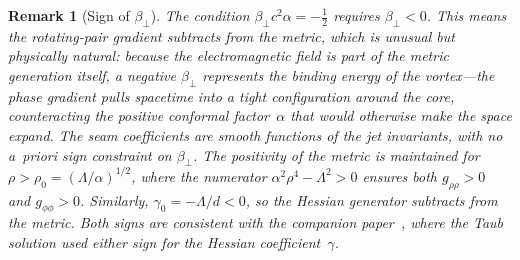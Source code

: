 \documentclass[pdflatex,sn-mathphys-num]{sn-jnl}
\theoremstyle{thmstyleone}%
\theoremstyle{thmstyletwo}%
\newtheorem{remark}[theorem]{Remark}
\theoremstyle{thmstylethree}%
\numberwithin{equation}{section}
\begin{document}
\begin{remark}[Sign of $\beta_\perp$]
\label{rem:beta-perp-sign}
The condition $\beta_\perp c^2 \alpha = -\tfrac{1}{2}$
requires $\beta_\perp < 0$.  This means the rotating-pair
gradient \emph{subtracts} from the metric, which is unusual
but physically natural: because the electromagnetic field is
part of the metric generation itself, a negative $\beta_\perp$
represents the \emph{binding energy} of the vortex---the
phase gradient pulls spacetime into a tight configuration
around the core, counteracting the positive conformal
factor~$\alpha$ that would otherwise make the space expand.
The seam coefficients are smooth functions of the jet
invariants, with no \emph{a~priori} sign constraint on
$\beta_\perp$.  The positivity of the metric is maintained
for $\rho > \rho_0 = (\Lambda/\alpha)^{1/2}$, where the
numerator $\alpha^2\rho^4 - \Lambda^2 > 0$ ensures both
$g_{\rho\rho} > 0$ and $g_{\phi\phi} > 0$.
Similarly, $\gamma_0 = -\Lambda/d < 0$, so the Hessian
generator subtracts from the metric.  Both signs are
consistent with the companion paper~\cite{seam1}, where
the Taub solution used either sign for the Hessian
coefficient~$\gamma$.
\end{remark}

\end{document}
